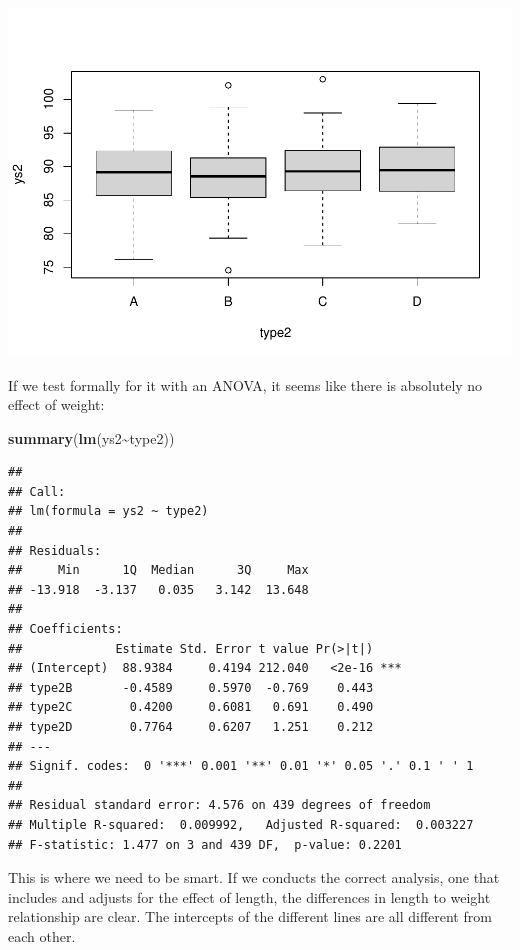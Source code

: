 \documentclass[
]{book}
\newenvironment{Shaded}{\begin{snugshade}}{\end{snugshade}}
\newcommand{\FunctionTok}[1]{\textcolor[rgb]{0.13,0.29,0.53}{\textbf{#1}}}
\newcommand{\NormalTok}[1]{#1}
\newcommand{\SpecialCharTok}[1]{\textcolor[rgb]{0.81,0.36,0.00}{\textbf{#1}}}
\begin{document}
\includegraphics{ECOMODbook_files/figure-latex/a10.12-1.pdf}

If we test formally for it with an ANOVA, it seems like there is absolutely no effect of weight:

\begin{Shaded}
\begin{Highlighting}[]
\FunctionTok{summary}\NormalTok{(}\FunctionTok{lm}\NormalTok{(ys2}\SpecialCharTok{\textasciitilde{}}\NormalTok{type2))}
\end{Highlighting}
\end{Shaded}

\begin{verbatim}
## 
## Call:
## lm(formula = ys2 ~ type2)
## 
## Residuals:
##     Min      1Q  Median      3Q     Max 
## -13.918  -3.137   0.035   3.142  13.648 
## 
## Coefficients:
##             Estimate Std. Error t value Pr(>|t|)    
## (Intercept)  88.9384     0.4194 212.040   <2e-16 ***
## type2B       -0.4589     0.5970  -0.769    0.443    
## type2C        0.4200     0.6081   0.691    0.490    
## type2D        0.7764     0.6207   1.251    0.212    
## ---
## Signif. codes:  0 '***' 0.001 '**' 0.01 '*' 0.05 '.' 0.1 ' ' 1
## 
## Residual standard error: 4.576 on 439 degrees of freedom
## Multiple R-squared:  0.009992,   Adjusted R-squared:  0.003227 
## F-statistic: 1.477 on 3 and 439 DF,  p-value: 0.2201
\end{verbatim}

This is where we need to be smart. If we conducts the correct analysis, one that includes and adjusts for the effect of length, the differences in length to weight relationship are clear. The intercepts of the different lines are all different from each other.
\end{document}

